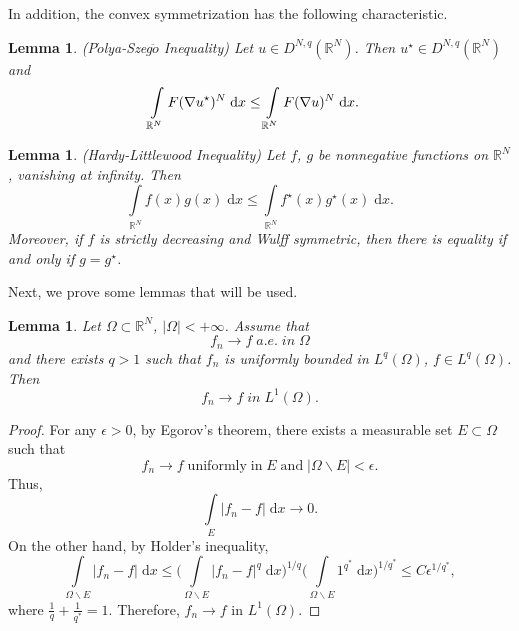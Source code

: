 \documentclass[11pt]{article}
\theoremstyle{plain}
\newtheorem{lemma}[theorem]{Lemma}
\numberwithin{equation}{section}
\newcommand{\R}{\mathbb{R}}
\begin{document}
In addition, the convex symmetrization has the following characteristic.
\begin{lemma}\label{le2.2}(P$\acute{o}$lya-Szeg$\ddot{o}$ Inequality)
Let $u\in D^{N,q}(\R^{N})$. Then $u^{\star}\in D^{N,q}(\R^{N})$ and
\begin{align}
    &\int\limits_{\R^{N}}F(\nabla u^{\star})^{N}\;\mathrm{d}x   \leq\int\limits_{\R^{N}}F(\nabla u)^{N}\;\mathrm{d}x.\notag
\end{align}
\end{lemma}
\begin{lemma}\label{le2.3}(Hardy-Littlewood Inequality)
Let $f$, $g$ be nonnegative functions on $\R^{N}$, vanishing at infinity. Then
$$
\int\limits_{\R^{N}}f(x)g(x)\;\mathrm{d}x\leq \int\limits_{\R^{N}}f^{\star}(x)g^{\star}(x)\;\mathrm{d}x.
$$
Moreover, if $f$ is strictly decreasing and Wulff symmetric, then there is equality if and only if $g=g^{\star}$.
\end{lemma}

Next, we prove some lemmas that will be used.

\begin{lemma}\label{le2.4}
Let $\Omega\subset\R^{N}$, $\lvert\Omega\rvert<+\infty$. Assume that
$$
f_{n}\rightarrow f\;a.e.\;in\;\Omega
$$
and there exists $q>1$ such that $f_{n}$ is uniformly bounded in $L^{q}(\Omega)$, $f\in L^{q}(\Omega)$. Then
$$
f_{n}\rightarrow f\;in\;L^{1}(\Omega).
$$
\end{lemma}
\begin{proof}
For any $\epsilon>0$, by Egorov's theorem, there exists a measurable set $E\subset\Omega$ such that
$$
f_{n}\rightarrow f\;\mathrm{uniformly}\;\mathrm{in}\;E\;\mathrm{and}\;\lvert\Omega\backslash E\rvert<\epsilon.
$$
Thus,
$$
\int\limits_{E}\lvert f_{n}-f\rvert\;\mathrm{d}x\rightarrow0.
$$
On the other hand, by Holder's inequality,
$$
\int\limits_{\Omega\backslash E}\lvert f_{n}-f\rvert\;\mathrm{d}x\leq\bigg(\int\limits_{ \Omega\backslash E}\lvert f_{n}-f\rvert^{q}\;\mathrm{d}x\bigg)^{1/q}\bigg(\int\limits_{ \Omega\backslash E}1^{q^{\ast}}\;\mathrm{d}x\bigg)^{1/q^{\ast}}\leq C\epsilon^{1/q^{\ast}},
$$
where $\frac{1}{q}+\frac{1}{q^{\ast}}=1$. Therefore, $f_{n}\rightarrow f$ in $L^{1}(\Omega)$.
\end{proof}
\end{document}
